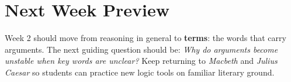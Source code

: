\documentclass[12pt]{article}
\begin{document}
\section*{Next Week Preview}
Week 2 should move from reasoning in general to \textbf{terms}: the words that carry arguments. The next guiding question should be: \textit{Why do arguments become unstable when key words are unclear?} Keep returning to \textit{Macbeth} and \textit{Julius Caesar} so students can practice new logic tools on familiar literary ground.
\end{document}
